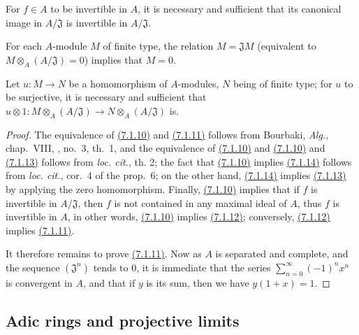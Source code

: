 \begin{cor}[7.1.12]
\label{cor-0.7.1.12}
For $f\in A$ to be invertible in $A$, it is necessary and sufficient that its
canonical image in $A/\mathfrak{J}$ is invertible in $A/\mathfrak{J}$.
\end{cor}

\begin{cor}[7.1.13]
\label{cor-0.7.1.13}
For each $A$-module $M$ of finite type, the relation $M=\mathfrak{J}M$
(equivalent to $M\otimes_A(A/\mathfrak{J})=0$) implies that $M=0$.
\end{cor}

\begin{cor}[7.1.14]
\label{cor-0.7.1.14}
Let $u:M\to N$ be a homomorphism of $A$-modules, $N$ being of finite type; for
$u$ to be surjective, it is necessary and sufficient that
$u\otimes 1:M\otimes_A(A/\mathfrak{J})\to N\otimes_A(A/\mathfrak{J})$ is.
\end{cor}

\begin{proof}
\label{proof-prop-0.7.1.10}
The equivalence of \hyperref[prop-0.7.1.10]{(7.1.10)} and \hyperref[cor-0.7.1.11]{(7.1.11)}
follows from Bourbaki, {\em Alg.}, chap.~VIII, , no.~3,
th.~1, and the equivalence of \hyperref[prop-0.7.1.10]{(7.1.10)} and
\hyperref[prop-0.7.1.10]{(7.1.10)} and \hyperref[cor-0.7.1.13]{(7.1.13)} follows from
{\em loc. cit.}, th. 2; the fact that \hyperref[prop-0.7.1.10]{(7.1.10)} implies
\hyperref[cor-0.7.1.14]{(7.1.14)} follows from {\em loc. cit.},
cor.~4 of the prop.~6; on the other hand, \hyperref[cor-0.7.1.14]{(7.1.14)} implies
\hyperref[cor-0.7.1.13]{(7.1.13)} by applying the zero homomorphism. Finally,
\hyperref[prop-0.7.1.10]{(7.1.10)} implies that if $f$ is invertible in $A/\mathfrak{J}$,
then $f$ is not contained in any maximal ideal of $A$, thus $f$ is invertible in $A$,
in other words, \hyperref[prop-0.7.1.10]{(7.1.10)} implies \hyperref[cor-0.7.1.12]{(7.1.12)};
conversely, \hyperref[cor-0.7.1.12]{(7.1.12)} implies \hyperref[cor-0.7.1.11]{(7.1.11)}.

It therefore remains to prove \hyperref[cor-0.7.1.11]{(7.1.11)}. Now as $A$ is separated and
complete, and the sequence $(\mathfrak{J}^n)$ tends to $0$, it is immediate that
the series $\sum_{n=0}^\infty(-1)^n x^n$ is convergent in $A$, and that if $y$
is its sum, then we have $y(1+x)=1$.
\end{proof}

\subsection{Adic rings and projective limits}
\label{subsection-adic-rings-and-projective-limits}

